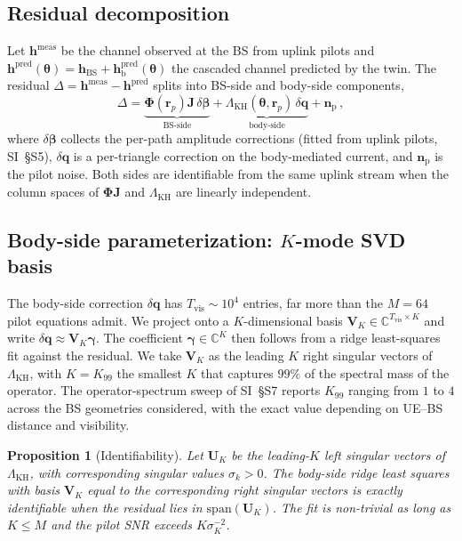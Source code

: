 \documentclass[journal,twocolumn,10pt]{IEEEtran}
\theoremstyle{plain}
\newtheorem{proposition}[theorem]{Proposition}
\theoremstyle{definition}
\theoremstyle{remark}
\newcommand{\rr}{\mathbf{r}}
\newcommand{\hh}{\bm{h}}
\newcommand{\Jmat}{\mathbf{J}}
\newcommand{\Phimat}{\mathbf{\Phi}}
\newcommand{\thetab}{\bm{\theta}}
\newcommand{\betab}{\bm{\beta}}
\newcommand{\gammab}{\bm{\gamma}}
\newcommand{\hBS}{\bm{h}_{\mathrm{BS}}}
\newcommand{\hbody}{\bm{h}_{\mathrm{b}}}
\newcommand{\Complex}{\mathbb{C}}
\begin{document}
\subsection{Residual decomposition}

Let $\hh^{\mathrm{meas}}$ be the channel observed at the BS from
uplink pilots and $\hh^{\mathrm{pred}}(\thetab) =
\hBS + \hbody^{\mathrm{pred}}(\thetab)$ the cascaded channel
predicted by the twin. The residual $\Delta = \hh^{\mathrm{meas}} -
\hh^{\mathrm{pred}}$ splits into BS-side and body-side components,
\begin{equation}\label{eq:residual}
\Delta = \underbrace{\Phimat(\rr_p)\Jmat\,\delta\betab}_{\text{BS-side}}
+ \underbrace{\Lambda_{\mathrm{KH}}(\thetab,\rr_p)\,\delta\bm{q}}_{\text{body-side}}
+ \bm{n}_{\mathrm{p}}\,,
\end{equation}
where $\delta\betab$ collects the per-path amplitude corrections
(fitted from uplink pilots, SI~\S{}S5), $\delta\bm{q}$ is a
per-triangle correction on the body-mediated current, and
$\bm{n}_{\mathrm{p}}$ is the pilot noise. Both sides are
identifiable from the same uplink stream when the column spaces of
$\Phimat\Jmat$ and $\Lambda_{\mathrm{KH}}$ are linearly independent.

\subsection{Body-side parameterization: \texorpdfstring{$K$}{K}-mode SVD basis}

The body-side correction $\delta\bm{q}$ has $T_{\mathrm{vis}} \sim
10^{4}$ entries, far more than the $M = 64$ pilot equations admit.
We project onto a $K$-dimensional basis $\bm{V}_K \in
\Complex^{T_{\mathrm{vis}}\times K}$ and write $\delta\bm{q}
\approx \bm{V}_K \gammab$. The coefficient $\gammab \in
\Complex^{K}$ then follows from a ridge least-squares fit against
the residual. We take $\bm{V}_K$ as the leading $K$ right singular
vectors of $\Lambda_{\mathrm{KH}}$, with $K = K_{99}$ the smallest
$K$ that captures $99\%$ of the spectral mass of the operator.
The operator-spectrum sweep of SI~\S{}S7 reports $K_{99}$ ranging
from $1$ to $4$ across the BS geometries considered, with the
exact value depending on UE--BS distance and visibility.

\begin{proposition}[Identifiability]\label{prop:ident}
Let $\bm{U}_K$ be the leading-$K$ left singular vectors of
$\Lambda_{\mathrm{KH}}$, with corresponding singular values $\sigma_k
> 0$. The body-side ridge least squares with basis $\bm{V}_K$ equal
to the corresponding right singular vectors is exactly
identifiable when the residual lies in $\mathrm{span}(\bm{U}_K)$.
The fit is non-trivial as long as $K \leq M$ and the pilot SNR
exceeds $K \sigma_K^{-2}$.
\end{proposition}
\end{document}
